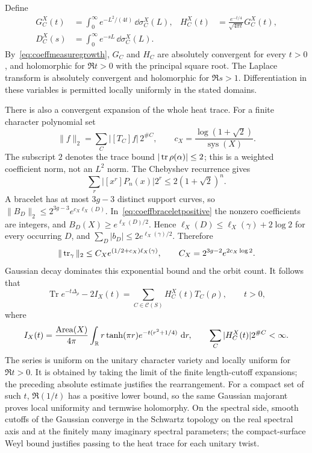 Define
\begin{align}
 G_C^X(t)&=\int_0^\infty e^{-L^2/(4t)}\,\dd\sigma_C^X(L),
 &H_C^X(t)&=\frac{e^{-t/4}}{\sqrt{4\pi t}}G_C^X(t),
 \label{eq:coeffheatdefinition}\\
 D_C^X(s)&=\int_0^\infty e^{-sL}\,\dd\sigma_C^X(L).
 &&\label{eq:coeffLaplacedefinition}
\end{align}
By~\eqref{eq:coeffmeasuregrowth}, $G_C$ and $H_C$ are absolutely
convergent for every $t>0$, and holomorphic for $\Re t>0$ with
the principal square root. The Laplace transform is absolutely
convergent and holomorphic for $\Re s>1$. Differentiation in these
variables is permitted locally uniformly in the stated domains.

There is also a convergent expansion of the whole heat trace.
For a finite character polynomial set
\[
 \|f\|_2=\sum_C|[T_C]f|\,2^{\#C},\qquad
 c_X=\frac{\log(1+\sqrt2)}{\operatorname{sys}(X)}.
\]
The subscript $2$ denotes the trace bound $|\operatorname{tr}\rho(\alpha)|\leq2$;
this is a weighted coefficient norm, not an $L^2$ norm.
The Chebyshev recurrence gives
\[
 \sum_r|[x^r]P_n(x)|2^r\leq2(1+\sqrt2)^n.
\]
A bracelet has at most $3g-3$ distinct support curves, so
$\|B_D\|_2\leq2^{3g-3}e^{c_X\ell_X(D)}$.
In~\eqref{eq:coeffbraceletpositive} the nonzero coefficients are
integers, and $B_D(X)\geq e^{\ell_X(D)/2}$. Hence
$\ell_X(D)\leq\ell_X(\gamma)+2\log2$ for every occurring $D$,
and $\sum_D|b_D|\leq2e^{\ell_X(\gamma)/2}$. Therefore
\begin{equation}
 \|\operatorname{tr}_\gamma\|_2\leq
 C_X e^{(1/2+c_X)\ell_X(\gamma)},\qquad
 C_X=2^{3g-2}e^{2c_X\log2}.
 \label{eq:coeffallchannelbound}
\end{equation}
Gaussian decay dominates this exponential bound and the orbit count.
It follows that
\begin{equation}
 \boxed{
 \operatorname{Tr}e^{-t\Delta_\rho}-2I_X(t)
 =\sum_{C\in\mathscr C(S)}H_C^X(t)T_C(\rho),\qquad t>0,
 }
 \label{eq:coefffullheatexpansion}
\end{equation}
where
\[
 I_X(t)=\frac{\operatorname{Area}(X)}{4\pi}
  \int_\mathbb R r\tanh(\pi r)e^{-t(r^2+1/4)}\,\mathop{}\!\mathrm d r,
 \qquad \sum_C|H_C^X(t)|2^{\#C}<\infty.
\]
The series is uniform on the unitary character variety and locally
uniform for $\Re t>0$. It is obtained by taking the limit of the
finite length-cutoff expansions; the preceding absolute estimate
justifies the rearrangement. For a compact set of such $t$,
$\Re(1/t)$ has a positive lower bound, so the same Gaussian
majorant proves local uniformity and termwise holomorphy. On the
spectral side, smooth cutoffs of the Gaussian converge in the
Schwartz topology on the real spectral axis and at the finitely
many imaginary spectral parameters; the compact-surface Weyl bound
justifies passing to the heat trace for each unitary twist.

